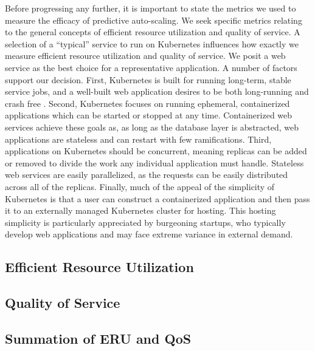 Before progressing any further, it is important to state the metrics we used
to measure the efficacy of predictive auto-scaling. We seek specific metrics relating to
the general concepts of efficient resource utilization and quality of service.
A selection of a ``typical'' service to run on Kubernetes influences how exactly
we measure efficient resource utilization and quality of service. We posit
a web service as the best choice for a representative application. A number
of factors support our decision. First, Kubernetes is built for running
long-term, stable service jobs, and a well-built web application desires to be
both long-running and crash free \cite{k8s-design-overview}. Second, Kubernetes
focuses on running ephemeral, containerized applications which can be started or
stopped at any time. Containerized web services achieve these goals as, as
long as the database layer is abstracted, web applications are stateless and can
restart with few ramifications. Third, applications on Kubernetes should be
concurrent, meaning replicas can be added or removed to divide the work any
individual application must handle. Stateless web services are easily
parallelized, as the requests can be easily distributed across all of the
replicas. Finally, much of the appeal of the simplicity of Kubernetes is that a
user can construct a containerized application and then pass it to an
externally managed Kubernetes cluster for hosting. This hosting simplicity is
particularly appreciated by burgeoning startups, who typically develop web
applications and may face extreme variance in external demand.

\subsection{Efficient Resource Utilization}



\subsection{Quality of Service}



\subsection{Summation of ERU and QoS}


